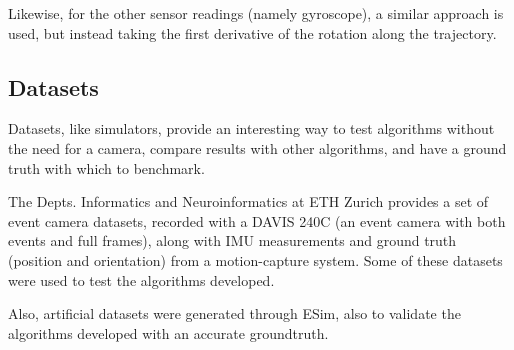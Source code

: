 Likewise, for the other sensor readings (namely gyroscope), a similar approach is used, but instead taking the first derivative of the rotation along the trajectory.


\subsection{Datasets}

Datasets, like simulators, provide an interesting way to test algorithms without the need for a camera, compare results with other algorithms, and have a ground truth with which to benchmark.

The Depts. Informatics and Neuroinformatics at ETH Zurich provides a set of event camera datasets, recorded with a DAVIS 240C (an event camera with both events and full frames), along with IMU measurements and ground truth  (position and orientation) from a motion-capture system. Some of these datasets were used to test the algorithms developed.

Also, artificial datasets were generated through ESim, also to validate the algorithms developed with an accurate groundtruth.

